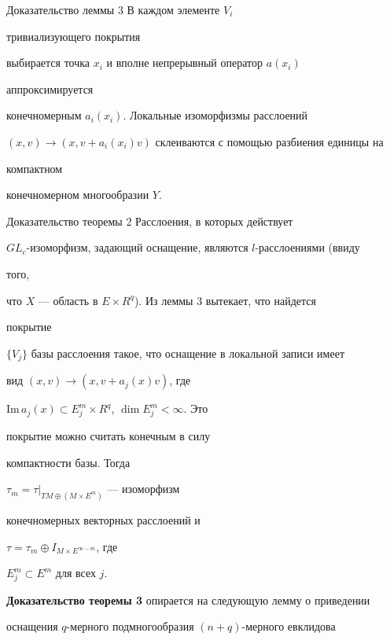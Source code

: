  


\begin{pf*}{Доказательство леммы 3} В каждом элементе $V_i$ 


тривиализующего покрытия 


выбирается точка $x_i$ и вполне непрерывный оператор $a(x_i)$ 


аппроксимируется 


конечномерным $a_i(x_i)$. Локальные изоморфизмы расслоений 


$(x,v)\to(x,v+a_i(x_i)v)$ склеиваются с помощью разбиения единицы на 


компактном 


конечномерном многообразии $Y$. 


\end{pf*} 


 


\begin{pf*}{Доказательство теоремы 2} Расслоения, в которых действует 


$GL_c$-изоморфизм, задающий оснащение, являются $l$-расслоениями (ввиду 


того, 


что $X$ --- область в $E\times R^q$). Из леммы 3 вытекает, что найдется 


покрытие 


$\{V_j\}$ базы расслоения такое, что оснащение в локальной записи имеет 


вид $(x,v)\to(x,v+a_j(x)v)$, где 


$\text{Im}\,a_j(x)\subset E_j^m\times R^q$, $\dim E_j^m<\infty$. Это 


покрытие можно считать конечным в силу 


компактности базы. Тогда 


$\tau_m=\left.\tau\right|_{TM\oplus(M\times E^m)}$ --- изоморфизм 


конечномерных векторных расслоений и 


$\tau=\tau_m\oplus I_{M\times E^{\infty-m}}$, где 


$E_j^m\subset E^m$ для всех $j$. 


\end{pf*} 


 


{\bf Доказательство теоремы 3} опирается на следующую лемму о приведении 


оснащения $q$-мерного подмногообразия $(n+q)$-мерного евклидова 


